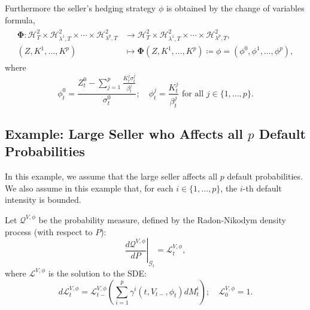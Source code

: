 \documentclass[11pt,a4paper]{article}
\numberwithin{equation}{section}
\theoremstyle{newPlain}
\theoremstyle{newDefinition}
\theoremstyle{newRemark}
\begin{document}
Furthermore the seller's hedging  strategy $\phi$ is obtained by the change of variables formula, 
\begin{align}\label{eq:3_non-linearChangeVariables1}
    \begin{aligned}
        \mathbf{\Phi}:\mathcal{H}_T^2\times\mathcal{H}_{\lambda^1,T}^2\times\cdots\times\mathcal{H}_{\lambda^p,T}^2&\rightarrow\mathcal{H}_T^2\times\mathcal{H}_{\lambda^1,T}^2\times\cdots\times\mathcal{H}_{\lambda^p,T}^2,\\
        (Z,K^1,\ldots,K^p)&\mapsto\mathbf{\Phi}(Z,K^1,\ldots,K^p)\coloneqq\phi=(\phi^0,\phi^1,\ldots,\phi^p),
    \end{aligned}
\end{align}
where %
\begin{equation*}
    \phi_t^0=\frac{Z_t^0 -\sum_{j=1}^p\frac{K_t^j\sigma_t^j}{\beta_t^j}}{\sigma_t^0};\quad\phi_t^j=\frac{K_t^j}{\beta_t^j}\text{ for all }j\in\{1,\ldots,p\}.
\end{equation*}

\subsection{\texorpdfstring{Example: Large Seller who Affects all $p$ Default Probabilities}{Example: Large Seller who Affects all p Default Probabilities}}\label{subsection_large2}

In this example,  we  assume that the large seller affects all $p$ default probabilities. We also assume in this example that, for each $i\in\{1,...,p\}$,  the $i$-th default intensity is bounded.

Let $\mathcal{Q}^{V,\phi}$ be the probability measure, defined by the Radon-Nikodym density process (with respect to $P$):
\begin{equation}\label{eq:3_RadonNikodym2}
    \left.\frac{d\mathcal{Q}^{V,\phi}}{dP}\right|_{\mathcal{G}_t}=\mathscr{L}_t^{V,\phi},
\end{equation}
where $\mathscr{L}^{V,\phi}$ is the solution to the SDE:
\begin{equation}\label{eq:3_DensityProcess2}
    d\mathscr{L}_t^{V,\phi} = \mathscr{L}_{t-}^{V,\phi}\left(\sum_{i=1}^p\gamma^i(t,V_{t-},\phi_t)dM_t^i\right);\quad \mathscr{L}_0^{V,\phi}=1.
\end{equation}
\end{document}
